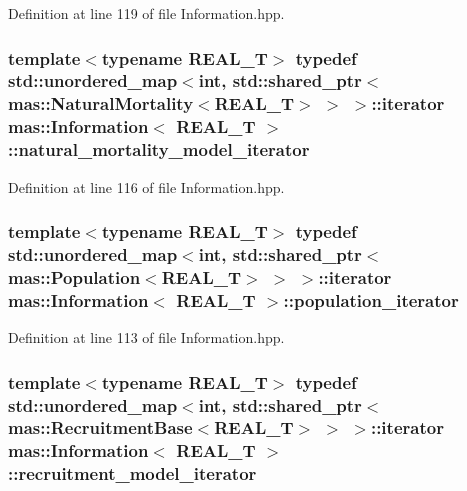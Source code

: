 Definition at line 119 of file Information.\-hpp.

\hypertarget{classmas_1_1_information_a146940168f5079ca711b74f29ea7d6bc}{
\subsubsection[{natural\-\_\-mortality\-\_\-model\-\_\-iterator}]{\setlength{\rightskip}{0pt plus 5cm}template$<$typename R\-E\-A\-L\-\_\-\-T$>$ typedef std\-::unordered\-\_\-map$<$int, std\-::shared\-\_\-ptr$<${\bf mas\-::\-Natural\-Mortality}$<$R\-E\-A\-L\-\_\-\-T$>$ $>$ $>$\-::iterator {\bf mas\-::\-Information}$<$ R\-E\-A\-L\-\_\-\-T $>$\-::{\bf natural\-\_\-mortality\-\_\-model\-\_\-iterator}}}\label{classmas_1_1_information_a146940168f5079ca711b74f29ea7d6bc}


Definition at line 116 of file Information.\-hpp.

\hypertarget{classmas_1_1_information_a61b09f185a136338d02e6307134677d1}{
\subsubsection[{population\-\_\-iterator}]{\setlength{\rightskip}{0pt plus 5cm}template$<$typename R\-E\-A\-L\-\_\-\-T$>$ typedef std\-::unordered\-\_\-map$<$int, std\-::shared\-\_\-ptr$<${\bf mas\-::\-Population}$<$R\-E\-A\-L\-\_\-\-T$>$ $>$ $>$\-::iterator {\bf mas\-::\-Information}$<$ R\-E\-A\-L\-\_\-\-T $>$\-::{\bf population\-\_\-iterator}}}\label{classmas_1_1_information_a61b09f185a136338d02e6307134677d1}


Definition at line 113 of file Information.\-hpp.

\hypertarget{classmas_1_1_information_a3948a990e86ca1174a515134fbd78dc5}{
\subsubsection[{recruitment\-\_\-model\-\_\-iterator}]{\setlength{\rightskip}{0pt plus 5cm}template$<$typename R\-E\-A\-L\-\_\-\-T$>$ typedef std\-::unordered\-\_\-map$<$int, std\-::shared\-\_\-ptr$<${\bf mas\-::\-Recruitment\-Base}$<$R\-E\-A\-L\-\_\-\-T$>$ $>$ $>$\-::iterator {\bf mas\-::\-Information}$<$ R\-E\-A\-L\-\_\-\-T $>$\-::{\bf recruitment\-\_\-model\-\_\-iterator}}}\label{classmas_1_1_information_a3948a990e86ca1174a515134fbd78dc5}


